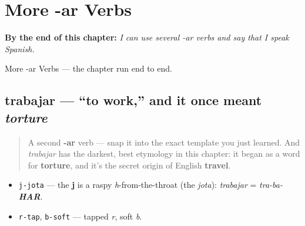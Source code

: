 
\chapter{More -ar Verbs}
\label{ch:more-ar-verbs}

\begin{chapteropening}
\textbf{By the end of this chapter:} \emph{I can use several -ar verbs and say that I speak Spanish.}

More -ar Verbs — the chapter run end to end.
\end{chapteropening}

\section[trabajar]{trabajar — \textquotedblleft{}to work,\textquotedblright{} and it once meant \emph{torture}}

\label{lesson:ES-C06-trabajar}



\begin{quote}
A second \textbf{-ar} verb — snap it into the exact template you just learned. And \emph{trabajar} has the darkest, best etymology in this chapter: it began as a word for \textbf{torture}, and it's the secret origin of English \textbf{travel}.
\end{quote}

\begin{sounds}
\begin{itemize}
\raggedright
  \item \texttt{j-jota} — the \textbf{j} is a raspy \emph{h}-from-the-throat (the \emph{jota}): \emph{trabajar} = \emph{tra-ba-\textbf{HAR}}.
  \item \texttt{r-tap}, \texttt{b-soft} — tapped \emph{r}, soft \emph{b}.
\end{itemize}
\end{sounds}

